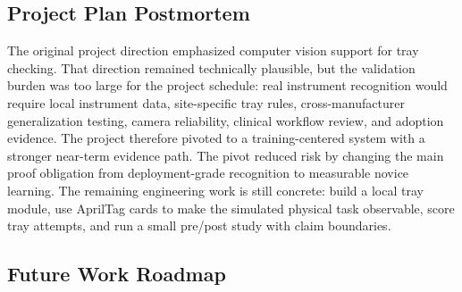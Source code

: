\documentclass[10pt,a4paper]{article}
\begin{document}
\subsection{Project Plan Postmortem}

The original project direction emphasized computer vision support for tray
checking. That direction remained technically plausible, but the validation
burden was too large for the project schedule: real instrument recognition would
require local instrument data, site-specific tray rules, cross-manufacturer
generalization testing, camera reliability, clinical workflow review, and
adoption evidence. The project therefore pivoted to a training-centered system
with a stronger near-term evidence path.
The pivot reduced risk by changing the main proof obligation from
deployment-grade recognition to measurable novice learning. The remaining
engineering work is still concrete: build a local tray module, use AprilTag
cards to make the simulated physical task observable, score tray attempts, and
run a small pre/post study with claim boundaries.
\subsection{Future Work Roadmap}
\end{document}
